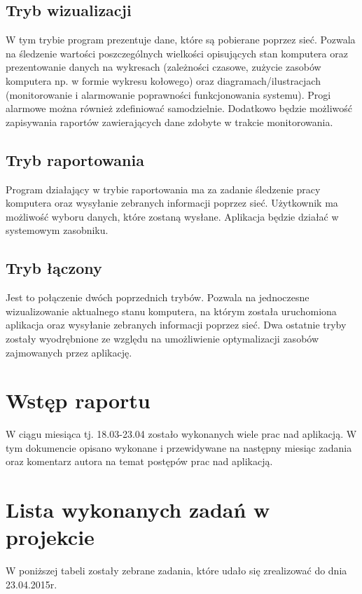 \documentclass[a4paper]{article}
\begin{document}
	\subsection{Tryb wizualizacji}
		W tym trybie program prezentuje dane, które są pobierane poprzez sieć. Pozwala na śledzenie wartości poszczególnych wielkości opisujących stan komputera oraz prezentowanie danych na wykresach (zależności czasowe, zużycie zasobów komputera np. w formie wykresu kołowego) oraz diagramach/ilustracjach (monitorowanie i alarmowanie poprawności funkcjonowania systemu). Progi alarmowe można również zdefiniować samodzielnie. Dodatkowo będzie możliwość zapisywania raportów zawierających dane zdobyte w trakcie monitorowania.
	
	\subsection{Tryb raportowania}
		Program działający w trybie raportowania ma za zadanie śledzenie pracy komputera oraz wysyłanie zebranych informacji poprzez sieć. Użytkownik ma możliwość wyboru danych, które zostaną wysłane. Aplikacja będzie działać w systemowym zasobniku.
	
	\subsection{Tryb łączony}
		Jest to połączenie dwóch poprzednich trybów. Pozwala na jednoczesne wizualizowanie aktualnego stanu komputera, na którym została uruchomiona aplikacja oraz wysyłanie zebranych informacji poprzez sieć. Dwa ostatnie tryby zostały wyodrębnione ze względu na umożliwienie optymalizacji zasobów zajmowanych przez aplikację.
	


\section{Wstęp raportu}

W ciągu miesiąca tj. 18.03-23.04 zostało wykonanych wiele prac nad aplikacją. W tym dokumencie opisano wykonane i przewidywane na następny miesiąc zadania oraz komentarz autora na temat postępów prac nad aplikacją.

\section{Lista wykonanych zadań w projekcie}

W poniższej tabeli zostały zebrane zadania, które udało się zrealizować do dnia 23.04.2015r.
\end{document}
